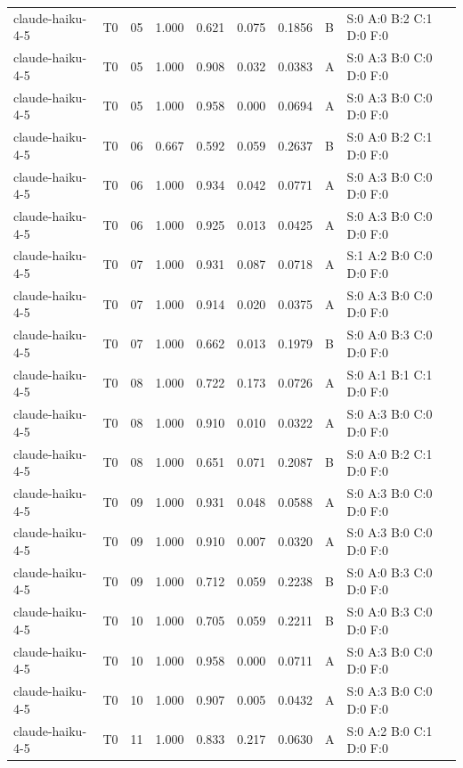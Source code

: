 \begin{longtable}{llrrrrrll}
claude-haiku-4-5 & T0 & 05 & 1.000 & 0.621 & 0.075 & 0.1856 & B & \tiny S:0 A:0 B:2 C:1 D:0 F:0 \\
claude-haiku-4-5 & T0 & 05 & 1.000 & 0.908 & 0.032 & 0.0383 & A & \tiny S:0 A:3 B:0 C:0 D:0 F:0 \\
claude-haiku-4-5 & T0 & 05 & 1.000 & 0.958 & 0.000 & 0.0694 & A & \tiny S:0 A:3 B:0 C:0 D:0 F:0 \\
claude-haiku-4-5 & T0 & 06 & 0.667 & 0.592 & 0.059 & 0.2637 & B & \tiny S:0 A:0 B:2 C:1 D:0 F:0 \\
claude-haiku-4-5 & T0 & 06 & 1.000 & 0.934 & 0.042 & 0.0771 & A & \tiny S:0 A:3 B:0 C:0 D:0 F:0 \\
claude-haiku-4-5 & T0 & 06 & 1.000 & 0.925 & 0.013 & 0.0425 & A & \tiny S:0 A:3 B:0 C:0 D:0 F:0 \\
claude-haiku-4-5 & T0 & 07 & 1.000 & 0.931 & 0.087 & 0.0718 & A & \tiny S:1 A:2 B:0 C:0 D:0 F:0 \\
claude-haiku-4-5 & T0 & 07 & 1.000 & 0.914 & 0.020 & 0.0375 & A & \tiny S:0 A:3 B:0 C:0 D:0 F:0 \\
claude-haiku-4-5 & T0 & 07 & 1.000 & 0.662 & 0.013 & 0.1979 & B & \tiny S:0 A:0 B:3 C:0 D:0 F:0 \\
claude-haiku-4-5 & T0 & 08 & 1.000 & 0.722 & 0.173 & 0.0726 & A & \tiny S:0 A:1 B:1 C:1 D:0 F:0 \\
claude-haiku-4-5 & T0 & 08 & 1.000 & 0.910 & 0.010 & 0.0322 & A & \tiny S:0 A:3 B:0 C:0 D:0 F:0 \\
claude-haiku-4-5 & T0 & 08 & 1.000 & 0.651 & 0.071 & 0.2087 & B & \tiny S:0 A:0 B:2 C:1 D:0 F:0 \\
claude-haiku-4-5 & T0 & 09 & 1.000 & 0.931 & 0.048 & 0.0588 & A & \tiny S:0 A:3 B:0 C:0 D:0 F:0 \\
claude-haiku-4-5 & T0 & 09 & 1.000 & 0.910 & 0.007 & 0.0320 & A & \tiny S:0 A:3 B:0 C:0 D:0 F:0 \\
claude-haiku-4-5 & T0 & 09 & 1.000 & 0.712 & 0.059 & 0.2238 & B & \tiny S:0 A:0 B:3 C:0 D:0 F:0 \\
claude-haiku-4-5 & T0 & 10 & 1.000 & 0.705 & 0.059 & 0.2211 & B & \tiny S:0 A:0 B:3 C:0 D:0 F:0 \\
claude-haiku-4-5 & T0 & 10 & 1.000 & 0.958 & 0.000 & 0.0711 & A & \tiny S:0 A:3 B:0 C:0 D:0 F:0 \\
claude-haiku-4-5 & T0 & 10 & 1.000 & 0.907 & 0.005 & 0.0432 & A & \tiny S:0 A:3 B:0 C:0 D:0 F:0 \\
claude-haiku-4-5 & T0 & 11 & 1.000 & 0.833 & 0.217 & 0.0630 & A & \tiny S:0 A:2 B:0 C:1 D:0 F:0 \\

\end{longtable}

